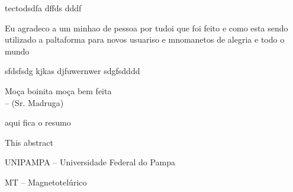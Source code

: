 \documentclass[12pt,twoside,oneright,a4paper,chapter=TITLE,english,brazil]{unipampa}
\begin{document}
\imprimircapa                   %

\imprimirfolhaderosto*          %

\imprimirfichacatalografica     %

\imprimirfolhadeaprovacao       %


\begin{dedicatoria}
    tectodsdfa dffds dddf
\end{dedicatoria}


\begin{agradecimentos}
    Eu agradeco a um minhao de pessoa por tudoi que foi feito e como esta sendo utilizado a paltaforma para novos usuariso e mnomanetos de alegria e todo o mundo
    
    \noindent sfdsfsdg kjkas djfuwernwer sdgfsdddd
\end{agradecimentos}


\begin{epigrafe}
    Moça boinita moça bem feita
    \DoubleSpacing \\
    -- (Sr. Madruga)
\end{epigrafe}


\begin{resumo}
 aqui fica o resumo
\end{resumo}


\begin{resumoingles}
 This abstract
\end{resumoingles}


\listoffigures      %
\listoftables       %


\begin{siglas}
    \item[UNIPAMPA --]         Universidade Federal do Pampa
    \item[MT --]               Magnetotelúrico
\end{siglas}
\end{document}
